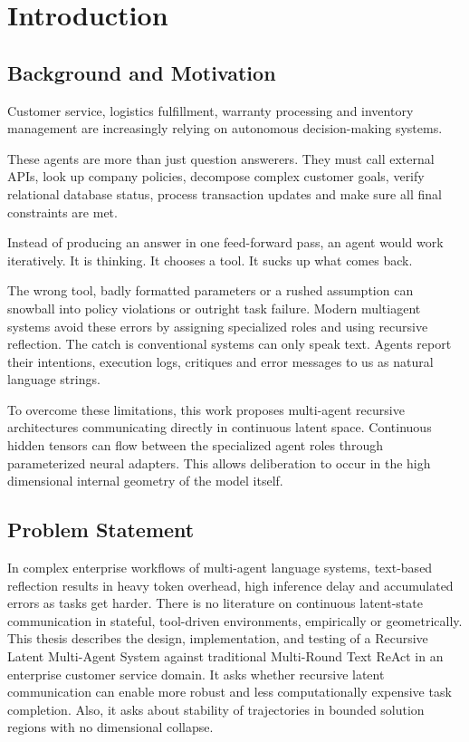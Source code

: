 \documentclass[a4paper, 12pt]{report}
\begin{document}
\chapter{Introduction}
\fi

\label{chap.1}
\section{Background and Motivation}
Customer service, logistics fulfillment, warranty processing and inventory management are increasingly relying on autonomous decision-making systems.

These agents are more than just question answerers. They must call external APIs, look up company policies, decompose complex customer goals, verify relational database status, process transaction updates and make sure all final constraints are met.

Instead of producing an answer in one feed-forward pass, an agent would work iteratively. It is thinking. It chooses a tool. It sucks up what comes back.

The wrong tool, badly formatted parameters or a rushed assumption can snowball into policy violations or outright task failure. Modern multiagent systems avoid these errors by assigning specialized roles and using recursive reflection. The catch is conventional systems can only speak text. Agents report their intentions, execution logs, critiques and error messages to us as natural language strings.

To overcome these limitations, this work proposes multi-agent recursive architectures communicating directly in continuous latent space. Continuous hidden tensors can flow between the specialized agent roles through parameterized neural adapters. This allows deliberation to occur in the high dimensional internal geometry of the model itself.

\section{Problem Statement}
In complex enterprise workflows of multi-agent language systems, text-based reflection results in heavy token overhead, high inference delay and accumulated errors as tasks get harder. There is no literature on continuous latent-state communication in stateful, tool-driven environments, empirically or geometrically. This thesis describes the design, implementation, and testing of a Recursive Latent Multi-Agent System against traditional Multi-Round Text ReAct in an enterprise customer service domain. It asks whether recursive latent communication can enable more robust and less computationally expensive task completion. Also, it asks about stability of trajectories in bounded solution regions with no dimensional collapse.
\end{document}

